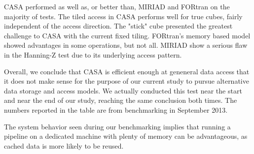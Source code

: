 \documentclass{article}
\begin{document}
CASA performed as well as, or better than, MIRIAD and FORtran on the
majority of tests.  The tiled access in CASA performs well for true
cubes, fairly independent of the access direction.  The "stick" cube
presented the greatest challenge to CASA with the current fixed
tiling. FORtran's memory based model showed advantages in some
operations, but not all. MIRIAD show a serious flaw in the Hanning-Z
test due to its underlying access pattern.

Overall, we conclude that CASA is efficient enough at geneneral data
access that it does not make sense for the purpose of our current
study to pursue alternative data storage and access models.  We
actually conducted this test near the start and near the end of our
study, reaching the same conclusion both times. The numbers reported
in the table are from benchmarking in September 2013.

The system behavior seen during our benchmarking implies that running
a pipeline on a dedicated machine with plenty of memory can be
advantageous, as cached data is more likely to be reused.
\end{document}
